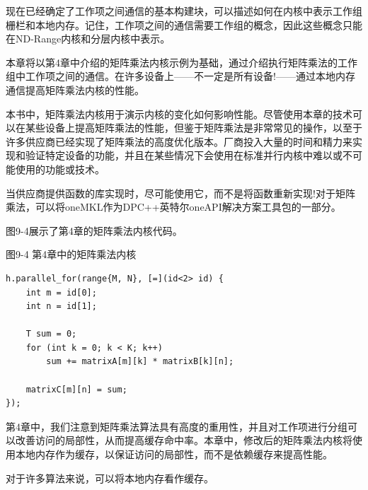 现在已经确定了工作项之间通信的基本构建块，可以描述如何在内核中表示工作组栅栏和本地内存。记住，工作项之间的通信需要工作组的概念，因此这些概念只能在ND-Range内核和分层内核中表示。\par

本章将以第4章中介绍的矩阵乘法内核示例为基础，通过介绍执行矩阵乘法的工作组中工作项之间的通信。在许多设备上——不一定是所有设备!——通过本地内存通信提高矩阵乘法内核的性能。\par

\begin{tcolorbox}[colback=blue!5!white,colframe=blue!75!black, title=关于矩阵乘法的注意事项]
本书中，矩阵乘法内核用于演示内核的变化如何影响性能。尽管使用本章的技术可以在某些设备上提高矩阵乘法的性能，但鉴于矩阵乘法是非常常见的操作，以至于许多供应商已经实现了矩阵乘法的高度优化版本。厂商投入大量的时间和精力来实现和验证特定设备的功能，并且在某些情况下会使用在标准并行内核中难以或不可能使用的功能或技术。
\end{tcolorbox}

\begin{tcolorbox}[colback=blue!5!white,colframe=blue!75!black, title=使用供应商提供的库!]
当供应商提供函数的库实现时，尽可能使用它，而不是将函数重新实现!对于矩阵乘法，可以将oneMKL作为DPC++英特尔oneAPI解决方案工具包的一部分。
\end{tcolorbox}

图9-4展示了第4章的矩阵乘法内核代码。\par

\hspace*{\fill} \par %
图9-4 第4章中的矩阵乘法内核
\begin{lstlisting}[caption={}]
h.parallel_for(range{M, N}, [=](id<2> id) {
	int m = id[0];
	int n = id[1];
	
	T sum = 0;
	for (int k = 0; k < K; k++)
		sum += matrixA[m][k] * matrixB[k][n];
		
	matrixC[m][n] = sum;
});
\end{lstlisting}

第4章中，我们注意到矩阵乘法算法具有高度的重用性，并且对工作项进行分组可以改善访问的局部性，从而提高缓存命中率。本章中，修改后的矩阵乘法内核将使用本地内存作为缓存，以保证访问的局部性，而不是依赖缓存来提高性能。\par

\begin{tcolorbox}[colback=red!5!white,colframe=red!75!black]
对于许多算法来说，可以将本地内存看作缓存。
\end{tcolorbox}

